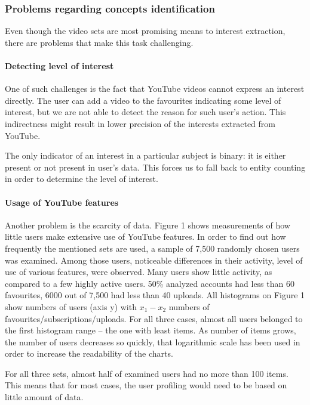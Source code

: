 \subsubsection{Problems regarding concepts identification}

Even though the video sets are most promising means to interest extraction, there
are problems that make this task challenging.

\paragraph{Detecting level of interest}
One of such challenges is the fact that YouTube videos cannot
express an interest directly. The user can add a video to the favourites
indicating some level of interest, but we are not able to detect the reason for
such user's action. This indirectness might result in lower precision of the
interests extracted from YouTube.

The only indicator of an interest in a particular subject is binary: it is
either present or not present in user's data. This forces us to fall back to
entity counting in order to determine the level of interest.

\paragraph{Usage of YouTube features} 
Another problem is the scarcity of data. Figure 1 shows measurements of how
little users make extensive use of YouTube features.
In order to find out how frequently the mentioned sets are used, a sample of 7,500
randomly chosen users was examined. Among those users, noticeable differences in their
activity, \ie level of use of various features, were observed. Many users show little activity,
as compared to a few highly active users.  50\% analyzed accounts had less than 60 favourites,
6000 out of 7,500 had less than 40 uploads.  All histograms on Figure 1 show
numbers of users (axis y) with $x_1-x_2$ numbers of
favourites/subscriptions/uploads. For all three cases, almost all users belonged
to the first histogram range -- the one with least items. As number of items
grows, the number of users decreases so quickly, that logarithmic scale has been
used in order to increase the readability of the charts.

For all three sets, almost half of examined users had no more than 100 items.
This means that for most cases, the user profiling would need to be based on
little amount of data.

